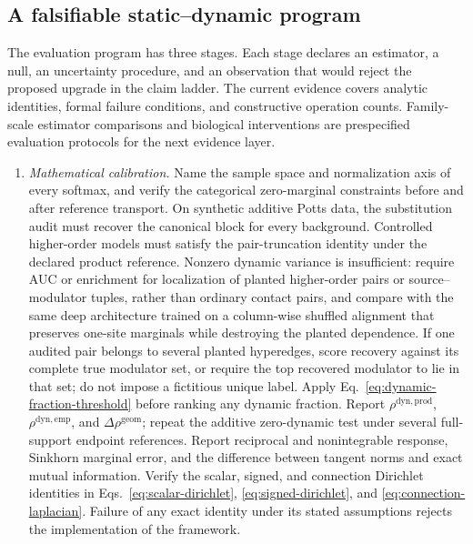 \documentclass[10pt]{article}
\theoremstyle{definition}
\theoremstyle{remark}
\newcommand{\BookInsert}[1]{}
\newcommand{\BookSection}[1]{\subsection{#1}}
\begin{document}
\BookSection{A falsifiable static--dynamic program}

\ifdefined\BOOKMODE
\BookInsert{chapters/12_falsification_cases}
\else
The evaluation program has three stages.  Each stage declares an estimator, a null, an uncertainty
procedure, and an observation that would reject the proposed upgrade in the claim ladder.  The
current evidence covers analytic identities, formal failure conditions, and constructive operation
counts.  Family-scale estimator comparisons and biological interventions are prespecified
evaluation protocols for the next evidence layer.

\begin{enumerate}
\setlength{\itemsep}{4pt}
\item \emph{Mathematical calibration.}  Name the sample space and normalization axis of every
softmax, and verify the categorical zero-marginal constraints before and after reference transport.
On synthetic additive Potts data, the substitution audit must recover the canonical block for every
background.  Controlled higher-order models must satisfy the pair-truncation identity under the
declared product reference.  Nonzero dynamic variance is insufficient: require AUC or enrichment
for localization of planted higher-order pairs or source--modulator tuples, rather than ordinary
contact pairs, and compare with the
same deep architecture trained on a column-wise shuffled alignment that preserves one-site
marginals while destroying the planted dependence.  If one audited pair belongs to several planted
hyperedges, score recovery against its complete true modulator set, or require the top recovered
modulator to lie in that set; do not impose a fictitious unique label.  Apply
Eq.~\ref{eq:dynamic-fraction-threshold} before ranking any dynamic fraction.  Report
$\rho^{\mathrm{dyn,prod}}$, $\rho^{\mathrm{dyn,emp}}$, and
$\Delta\rho^{\mathrm{geom}}$; repeat the additive zero-dynamic test under several full-support
endpoint references.  Report reciprocal and nonintegrable response, Sinkhorn marginal error,
and the difference between tangent norms and exact mutual information.  Verify the scalar, signed,
and connection Dirichlet identities in Eqs.~\ref{eq:scalar-dirichlet},
\ref{eq:signed-dirichlet}, and \ref{eq:connection-laplacian}.  Failure of any exact identity under
its stated assumptions rejects the implementation of the framework.


\end{enumerate}
\end{document}
